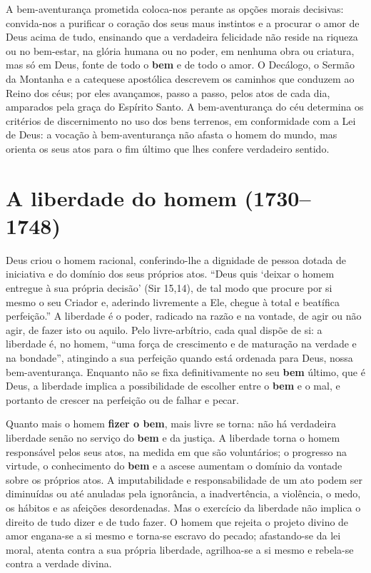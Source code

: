 A bem-aventurança prometida coloca-nos perante as opções morais decisivas: convida-nos a purificar o coração dos seus maus instintos e a procurar o amor de Deus acima de tudo, ensinando que a verdadeira felicidade não reside na riqueza ou no bem-estar, na glória humana ou no poder, em nenhuma obra ou criatura, mas só em Deus, fonte de todo o \textbf{bem} e de todo o amor. O Decálogo, o Sermão da Montanha e a catequese apostólica descrevem os caminhos que conduzem ao Reino dos céus; por eles avançamos, passo a passo, pelos atos de cada dia, amparados pela graça do Espírito Santo. A bem-aventurança do céu determina os critérios de discernimento no uso dos bens terrenos, em conformidade com a Lei de Deus: a vocação à bem-aventurança não afasta o homem do mundo, mas orienta os seus atos para o fim último que lhes confere verdadeiro sentido.

\section{A liberdade do homem (1730--1748)}

Deus criou o homem racional, conferindo-lhe a dignidade de pessoa dotada de iniciativa e do domínio dos seus próprios atos. ``Deus quis `deixar o homem entregue à sua própria decisão' (Sir 15,14), de tal modo que procure por si mesmo o seu Criador e, aderindo livremente a Ele, chegue à total e beatífica perfeição.'' A liberdade é o poder, radicado na razão e na vontade, de agir ou não agir, de fazer isto ou aquilo. Pelo livre-arbítrio, cada qual dispõe de si: a liberdade é, no homem, ``uma força de crescimento e de maturação na verdade e na bondade'', atingindo a sua perfeição quando está ordenada para Deus, nossa bem-aventurança. Enquanto não se fixa definitivamente no seu \textbf{bem} último, que é Deus, a liberdade implica a possibilidade de escolher entre o \textbf{bem} e o mal, e portanto de crescer na perfeição ou de falhar e pecar.

Quanto mais o homem \textbf{fizer o bem}, mais livre se torna: não há verdadeira liberdade senão no serviço do \textbf{bem} e da justiça. A liberdade torna o homem responsável pelos seus atos, na medida em que são voluntários; o progresso na virtude, o conhecimento do \textbf{bem} e a ascese aumentam o domínio da vontade sobre os próprios atos. A imputabilidade e responsabilidade de um ato podem ser diminuídas ou até anuladas pela ignorância, a inadvertência, a violência, o medo, os hábitos e as afeições desordenadas. Mas o exercício da liberdade não implica o direito de tudo dizer e de tudo fazer. O homem que rejeita o projeto divino de amor engana-se a si mesmo e torna-se escravo do pecado; afastando-se da lei moral, atenta contra a sua própria liberdade, agrilhoa-se a si mesmo e rebela-se contra a verdade divina.

